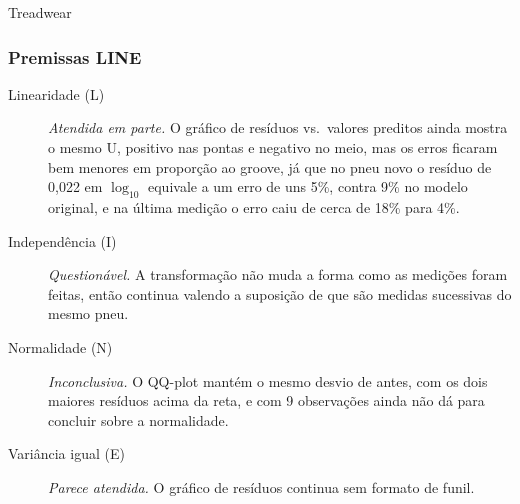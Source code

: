 \begin{dataset}{Treadwear}
\subsubsection{Premissas LINE}

\begin{description}
    \item[Linearidade (L)] \textit{Atendida em parte.} O gráfico de resíduos vs.\ valores preditos ainda mostra o mesmo U, positivo nas pontas e negativo no meio, mas os erros ficaram bem menores em proporção ao groove, já que no pneu novo o resíduo de 0,022 em $\log_{10}$ equivale a um erro de uns 5\%, contra 9\% no modelo original, e na última medição o erro caiu de cerca de 18\% para 4\%.
    \item[Independência (I)] \textit{Questionável.} A transformação não muda a forma como as medições foram feitas, então continua valendo a suposição de que são medidas sucessivas do mesmo pneu.
    \item[Normalidade (N)] \textit{Inconclusiva.} O QQ-plot mantém o mesmo desvio de antes, com os dois maiores resíduos acima da reta, e com 9 observações ainda não dá para concluir sobre a normalidade.
    \item[Variância igual (E)] \textit{Parece atendida.} O gráfico de resíduos continua sem formato de funil.
\end{description}

\end{dataset}


